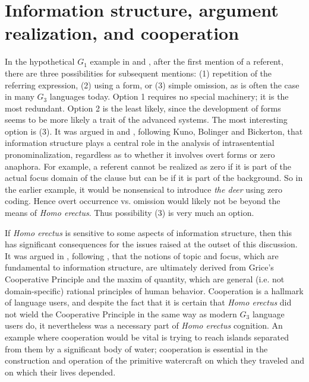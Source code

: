 \documentclass[output=paper,colorlinks,citecolor=brown]{langscibook}
\begin{document}
\section{Information structure, argument realization, and cooperation}\label{sec:vanvalin:4}

In the hypothetical $G_1$ example in  and , after the first mention of a referent, there are three possibilities for subsequent mentions: (1) repetition of the referring expression, (2) using a  form, or  (3) simple omission, as is often the case in many $G_3$ languages today.  Option 1 requires no special machinery; it is the most redundant.  Option 2 is the least likely, since the development of  forms seems to be more likely a trait of the advanced systems.  The most interesting option is (3).  It was argued in \citet{van1990functionalism} and \citet{van1997syntax}, following Kuno, Bolinger and Bickerton, that information structure plays a central role in the analysis of intrasentential pronominalization, regardless as to whether it involves overt  forms or zero anaphora.  For example, a referent cannot be realized as zero if it is part of the actual focus 
domain of the clause but can be if it is part of the background.  So in the earlier example, it would be nonsensical to introduce \emph{the deer} using zero coding.  Hence overt occurrence vs. omission would likely not be beyond the means of \emph{Homo erectus}.  Thus possibility (3) is very much an option.

If \emph{Homo erectus} is sensitive to some aspects of information structure, then this has significant consequences for the issues raised at the outset of this discussion.  It was argued in \citet{van1993synopsis}, following \citet{kempson1975presupposition}, that the notions of topic and focus, which are fundamental to information structure, are ultimately derived from Grice’s Cooperative Principle and the maxim of quantity, which are general (i.e. not domain-specific) rational principles of human behavior.  Cooperation is a hallmark of language users, and despite the fact that it is certain that \emph{Homo erectus} did not wield the Cooperative Principle in the same way as modern $G_3$ language users do, it nevertheless was a necessary part of \emph{Homo erectus} cognition.  An example where cooperation would be vital is trying to reach islands separated from them by a significant body of water; cooperation is essential in the construction and operation of the primitive watercraft on which they traveled and on which their lives depended.
\end{document}
